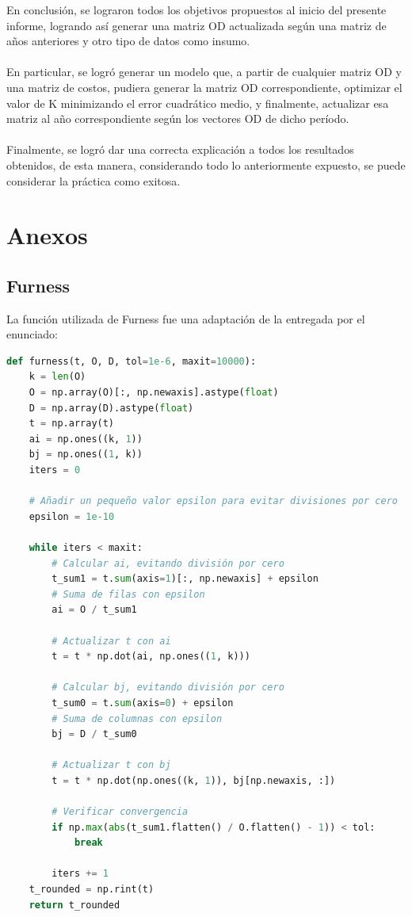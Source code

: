 \documentclass[12pt]{article} %
\begin{document}
En conclusión, se lograron todos los objetivos propuestos al inicio del presente informe, logrando así generar una matriz OD actualizada según una matriz de años anteriores y otro tipo de datos como insumo.
\\ \\
En particular, se logró generar un modelo que, a partir de cualquier matriz OD y una matriz de costos, pudiera generar la matriz OD correspondiente, optimizar el valor de K minimizando el error cuadrático medio, y finalmente, actualizar esa matriz al año correspondiente según los vectores OD de dicho período.
\\ \\
Finalmente, se logró dar una correcta explicación a todos los resultados obtenidos, de esta manera, considerando todo lo anteriormente expuesto, se puede considerar la práctica como exitosa.

\newpage
\section{Anexos}

\subsection{Furness}

La función utilizada de Furness fue una adaptación de la entregada por el enunciado:

\begin{lstlisting}[language=Python]
  def furness(t, O, D, tol=1e-6, maxit=10000):
    k = len(O)
    O = np.array(O)[:, np.newaxis].astype(float)
    D = np.array(D).astype(float)
    t = np.array(t)
    ai = np.ones((k, 1))
    bj = np.ones((1, k))
    iters = 0
    
    # Añadir un pequeño valor epsilon para evitar divisiones por cero
    epsilon = 1e-10

    while iters < maxit:
        # Calcular ai, evitando división por cero
        t_sum1 = t.sum(axis=1)[:, np.newaxis] + epsilon  
        # Suma de filas con epsilon
        ai = O / t_sum1
        
        # Actualizar t con ai
        t = t * np.dot(ai, np.ones((1, k)))
        
        # Calcular bj, evitando división por cero
        t_sum0 = t.sum(axis=0) + epsilon  
        # Suma de columnas con epsilon
        bj = D / t_sum0
        
        # Actualizar t con bj
        t = t * np.dot(np.ones((k, 1)), bj[np.newaxis, :])
        
        # Verificar convergencia
        if np.max(abs(t_sum1.flatten() / O.flatten() - 1)) < tol:
            break

        iters += 1
    t_rounded = np.rint(t)
    return t_rounded
\end{lstlisting}

\end{document}
